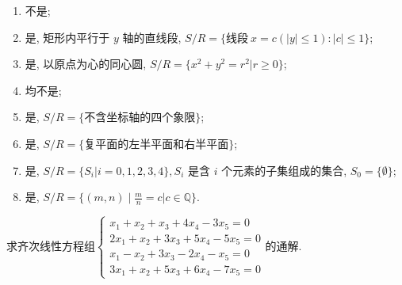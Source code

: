 \begin{exercise}
\begin{exgroup}
        \begin{answer}
            \begin{enumerate}
                \item 不是;
                \item 是, 矩形内平行于 \(y\) 轴的直线段, \(S/R = \{ \text{线段} \ x = c (|y| \leq 1) : |c| \leq 1 \} \);
                \item 是, 以原点为心的同心圆, \(S/R = \{ x^2 + y^2 = r^2 | r \geq 0 \} \);
                \item 均不是;
                \item 是, \(S/R = \{ \text{不含坐标轴的四个象限} \} \);
                \item 是, \(S/R = \{ \text{复平面的左半平面和右半平面} \} \);
                \item 是, \(S/R = \{ S_i | i = 0, 1, 2, 3, 4 \}, S_i \) 是含 \(i\) 个元素的子集组成的集合, \(S_0 = \{ \emptyset \}\);
                \item 是, \(S/R = \{ (m,n) \mid \frac{m}{n} = c | c \in \mathbb{Q} \}\).
            \end{enumerate}
        \end{answer}

        \item 求齐次线性方程组$\begin{cases}
                x_1+x_2+x_3+4x_4-3x_5=0   \\
                2x_1+x_2+3x_3+5x_4-5x_5=0 \\
                x_1-x_2+3x_3-2x_4-x_5=0   \\
                3x_1+x_2+5x_3+6x_4-7x_5=0
            \end{cases}$的通解.


\end{exgroup}
\end{exercise}
